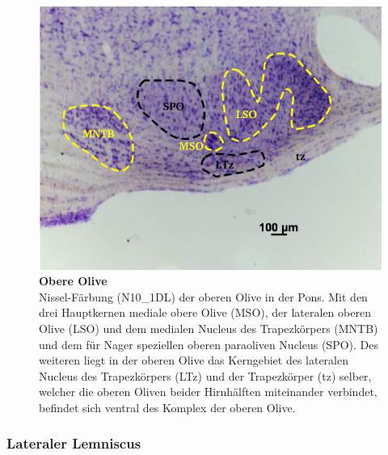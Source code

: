 \documentclass[12pt,a4paper,pdftex]{article}
\begin{document}
\begin{figure}[H]
    \centering
    \includegraphics{pictures/auditory/obere_olive.png}
    \caption[Obere Olive]{\textbf{Obere Olive}\\
    Nissel-Färbung (N10\_1DL) der oberen Olive in der Pons. Mit den drei Hauptkernen mediale obere Olive (MSO), der lateralen oberen Olive (LSO) und dem medialen Nucleus des Trapezkörpers (MNTB) und dem für Nager speziellen oberen paraoliven Nucleus (SPO). Des weiteren liegt in der oberen Olive das Kerngebiet des lateralen Nucleus des Trapezkörpers (LTz) und der Trapezkörper (tz) selber, welcher die oberen Oliven beider Hirnhälften miteinander verbindet, befindet sich ventral des Komplex der oberen Olive.}
    \label{fig:obere_Olive}
\end{figure}

\subsubsection*{Lateraler Lemniscus}
\end{document}
